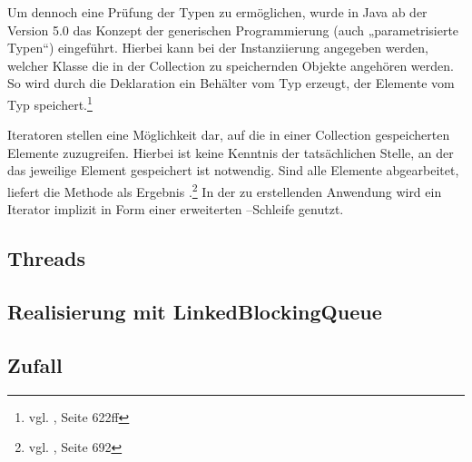 Um dennoch eine Prüfung der Typen zu ermöglichen, wurde in Java ab der Version 5.0 das Konzept der generischen Programmierung (auch „parametrisierte Typen“) eingeführt. Hierbei kann bei der Instanziierung angegeben werden, welcher Klasse die in der Collection zu speichernden Objekte angehören werden. So wird durch die Deklaration  ein Behälter vom Typ  erzeugt, der Elemente vom Typ  speichert.\footnote{vgl. \cite{javaorange}, Seite 622ff}

Iteratoren stellen eine Möglichkeit dar, auf die in einer Collection gespeicherten Elemente zuzugreifen. Hierbei ist keine Kenntnis der tatsächlichen Stelle, an der das jeweilige Element gespeichert ist notwendig. Sind alle Elemente abgearbeitet, liefert die Methode  als Ergebnis .\footnote{vgl. \cite{javaorange}, Seite 692} In der zu erstellenden Anwendung wird ein Iterator implizit in Form einer erweiterten –Schleife genutzt.

\subsection{Threads} %
\label{sub:die_klasse_thread}


\subsection{Realisierung mit LinkedBlockingQueue} %
\label{sub:realisierung_mit_linkedblockingqueue}


\subsection{Zufall} %
\label{sub:zufall}


